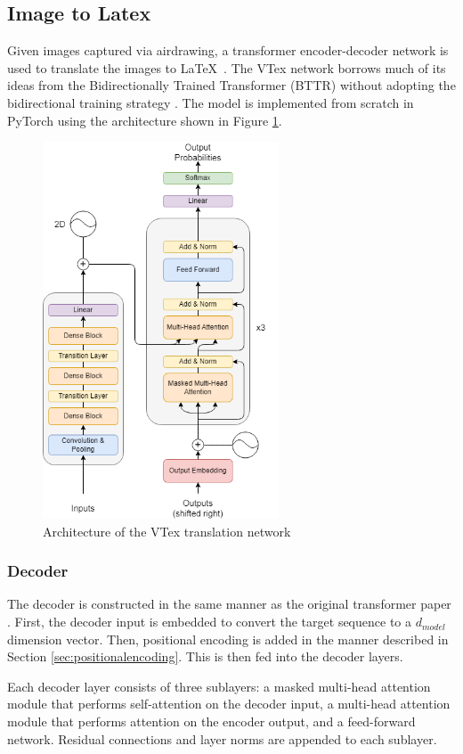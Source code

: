 
\subsection{Image to Latex}
Given images captured via airdrawing, a transformer encoder-decoder network is used to translate the images to \LaTeX\ . The VTex network borrows much of its ideas from the Bidirectionally Trained Transformer (BTTR) without adopting the bidirectional training strategy \cite{ZhaoBTTR2021}. The model is implemented from scratch in PyTorch using the architecture shown in Figure \ref{fig:architecture}.

\begin{figure}[h!]
    \centering
    \includegraphics[width=7cm]{images/vtex_network.png}
    \caption{Architecture of the VTex translation network}
    \label{fig:architecture}
\end{figure}

\subsubsection{Decoder}
The decoder is constructed in the same manner as the original transformer paper \cite{Attention}. First, the decoder input is embedded to convert the target sequence to a $d_{model}$ dimension vector. Then, positional encoding is added in the manner described in Section \ref{sec:positionalencoding}. This is then fed into the decoder layers. 

Each decoder layer consists of three sublayers: a masked multi-head attention module that performs self-attention on the decoder input, a multi-head attention module that performs attention on the encoder output, and a feed-forward network. Residual connections and layer norms are appended to each sublayer. 

